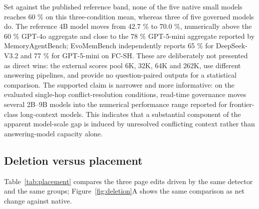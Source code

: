 \documentclass[journal=jcisd8,manuscript=article]{achemso}
\begin{document}
Set against the published reference band, none of the five native small models reaches 60 \% on this three-condition mean, whereas three of five governed models do. The reference 4B model moves from 42.7 \% to 70.0 \%, numerically above the 60 \% GPT-4o aggregate and close to the 78 \% GPT-5-mini aggregate reported by MemoryAgentBench; EvoMemBench independently reports 65 \% for DeepSeek-V3.2 and 77 \% for GPT-5-mini on FC-SH. These are deliberately not presented as direct wins: the external scores pool 6K, 32K, 64K and 262K, use different answering pipelines, and provide no question-paired outputs for a statistical comparison. The supported claim is narrower and more informative: on the evaluated single-hop conflict-resolution conditions, read-time governance moves several 2B--9B models into the numerical performance range reported for frontier-class long-context models. This indicates that a substantial component of the apparent model-scale gap is induced by unresolved conflicting context rather than answering-model capacity alone.

\subsection{Deletion versus placement}
\label{sec:placement}

Table~\ref{tab:placement} compares the three page edits driven by the same detector and the same groups; Figure~\ref{fig:deletion}A shows the same comparison as net change against native.
\end{document}
